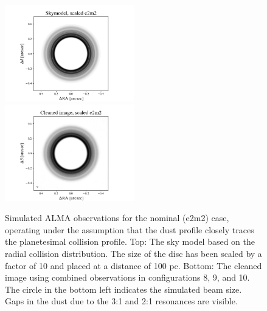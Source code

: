 \documentclass[fleqn,usenatbib]{mnras}
\begin{document}
\begin{figure}
\begin{center}
    \includegraphics[width=0.5\textwidth]{alma/skymodel_e2m2.png}
    \includegraphics[width=0.5\textwidth]{alma/xy_e2m2.png}
    \caption{Simulated ALMA observations for the nominal (e2m2) case, operating under the assumption that the dust profile closely traces the planetesimal collision profile.  Top: 
    The sky model based on the radial collision distribution. The size of the disc has been scaled by a factor of 10 and placed at  a distance of 100 pc. Bottom: The cleaned image using 
    combined observations in configurations 8, 9, and 10. The circle in the bottom left indicates the simulated beam size. Gaps in the dust due to the 3:1 and 2:1 resonances are visible. 
    \label{fig:alma_sim_obs}}
\end{center}
\end{figure}
\end{document}
